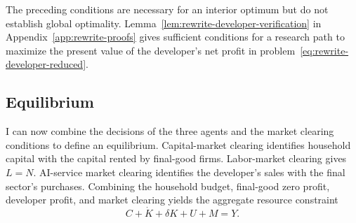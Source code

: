 The preceding conditions are necessary for an interior optimum but do not
establish global optimality.
Lemma~\ref{lem:rewrite-developer-verification} in
Appendix~\ref{app:rewrite-proofs} gives sufficient conditions for a research
path to maximize the present value of the developer's net profit in
problem~\eqref{eq:rewrite-developer-reduced}.


\subsection{Equilibrium}
\label{subsec:rewrite-equilibrium}

I can now combine the decisions of the three agents and the market clearing conditions to define an equilibrium. Capital-market clearing
identifies household capital with the capital rented by final-good firms.
Labor-market clearing gives $L=N$. AI-service market clearing identifies the
developer's sales with the final sector's purchases. Combining the household
budget, final-good zero profit, developer profit, and market clearing yields
the aggregate resource constraint
\begin{equation}
 C+\dot K+\delta K+U+M=Y.
 \label{eq:rewrite-resource}
\end{equation}

